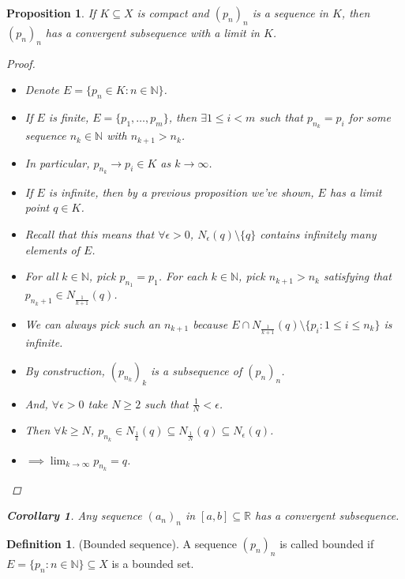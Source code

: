 \documentclass[10pt]{article}
\newcommand{\N}{\mathbb{N}}
\newcommand{\R}{\mathbb{R}}
\newtheorem{corollary}[theorem]{Corollary}
\newtheorem{proposition}[theorem]{Proposition}
\theoremstyle{definition}
\newtheorem{definition}[theorem]{Definition}
\theoremstyle{remark}
\begin{document}
\begin{proposition}
    If $K \subseteq X$ is compact and $(p_n)_n$ is a sequence in $K$, then $(p_n)_n$ has a convergent subsequence with a limit in $K$.
    \begin{proof}
        \hfill
        \begin{itemize}
            \item Denote $E = \{p_n \in K : n \in \N\}$.
            \item If $E$ is finite, $E = \{p_1, \ldots, p_m\}$, then $\exists 1 \leq i < m$ such that $p_{n_k} = p_i$ for some sequence $n_k \in \N$ with $n_{k+1} > n_k$.
            \item In particular, $p_{n_k} \to p_i \in K$ as $k \to \infty$.
            \item If $E$ is infinite, then by a previous proposition we've shown, $E$ has a limit point $q \in K$.
            \item Recall that this means that $\forall \epsilon> 0$, $N_\epsilon(q) \setminus \{q\}$ contains infinitely many elements of $E$.
            \item For all $k \in \N$, pick $p_{n_1} = p_1$. For each $k \in \N$, pick $n_{k+1} > n_k$ satisfying that $p_{n_k + 1} \in N_{\frac{1}{k+1}}(q)$.
            \item We can always pick such an $n_{k+1}$ because $E \cap N_{\frac{1}{k+1}}(q) \setminus \{p_i : 1 \leq i \leq n_k\}$ is infinite.
            \item By construction, $(p_{n_k})_k$ is a subsequence of $(p_n)_n$.
            \item And, $\forall \epsilon> 0$ take $N \geq 2$ such that $\frac{1}{N} < \epsilon$.
            \item Then $\forall k \geq N$, $p_{n_k} \in N_{\frac{1}{k}}(q) \subseteq N_{\frac{1}{N}}(q) \subseteq N_\epsilon(q)$.
            \item $\implies \lim_{k \to \infty} p_{n_k} = q$.
        \end{itemize}
    \end{proof}
    \begin{corollary}
        Any sequence $(a_n)_n$ in $[a, b] \subseteq \R$ has a convergent subsequence.
    \end{corollary}
\end{proposition}

\begin{definition}
    (Bounded sequence).
    A sequence $(p_n)_n$ is called bounded if $E = \{p_n : n \in \N\} \subseteq X$ is a bounded set.
\end{definition}
\end{document}

